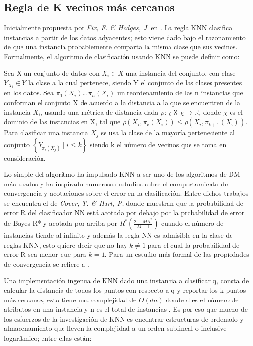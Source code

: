 \subsection{Regla de K vecinos más cercanos}

Inicialmente propuesta por \emph{Fix, E. \& Hodges, J.} en \cite{fix1951discriminatory}. La regla KNN clasifica instancias a partir de los datos adyacentes; esto viene dado bajo el razonamiento de que una instancia probablemente comparta la misma clase que sus vecinos. Formalmente, el algoritmo de clasificación usando KNN se puede definir como:\\  

\begin{definicion}
Sea X un conjunto de datos con $X_i\in X$ una instancia del conjunto, con clase $Y_{X_i}\in Y$ la clase a la cual pertenece, siendo Y el conjunto de las clases presentes en los datos. Sea $\pi_1(X_i)\dots \pi_n(X_i)$ un reordenamiento de las n instancias que conforman el conjunto X de acuerdo a la distancia a la que se encuentren de la instancia $X_i$, usando una métrica de distancia dada $\rho:\chi$ \texttt{X} $\chi \rightarrow \mathbb{R}$, donde $\chi$ es el dominio de las instancias en X, tal que $\rho(X_i,\pi_k(X_i)) \leq \rho(X_i,\pi_{k+1}(X_i))$. Para clasificar una instancia $X_j$ se usa la clase de la mayoría perteneciente al conjunto $\left\{Y_{\pi_i(X_j)} \mid i \leq k\right\}$ siendo k el número de vecinos que se toma en consideración. \cite{shalev2014understanding}
\end{definicion}

Lo simple del algoritmo ha impulsado KNN a ser uno de los algoritmos de DM más usados y ha inspirado numerosos estudios sobre el comportamiento de convergencia y acotaciones sobre el error en la clasificación. Entre dichos trabajos se encuentra el de \emph{Cover, T. \& Hart, P.} \cite{cover1967nearest} donde muestran que la probabilidad de error R del clasificador NN está acotada por debajo por la probabilidad de error de Bayes R* y acotada por arriba por $R^*(\frac{2-MR^*}{M-1})$ cuando el número de instancias tiende al infinito y además la regla NN es admisible en la clase de reglas KNN, esto quiere decir que no hay $k\neq 1$ para el cual la probabilidad de error R sea menor que para $k=1$. Para un estudio más formal de las propiedades de convergencia se refiere a \cite{devroye2013probabilistic}.

Una implementación ingenua de KNN dado una instancia a clasificar q, consta de calcular la distancia de todos los puntos con respecto a q y reportar los k puntos más cercanos; esto tiene una complejidad de $O(dn)$ donde d es el número de atributos en una instancia y n es el total de instancias \cite{shakhnarovich2006nearest}. Es por eso que mucho de los esfuerzos de la investigación de KNN es encontrar estructuras de ordenado y almacenamiento que lleven la complejidad a un orden sublineal o inclusive logarítmico; entre ellas están:

